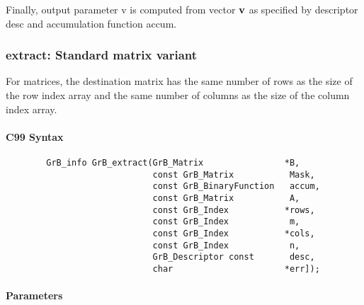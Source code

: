 Finally, output parameter {\sf v} is computed from vector ${\bf v}$ as
specified by descriptor {\sf desc} and accumulation function {\sf accum}.



\subsubsection{{\sf extract}: Standard matrix variant}

For matrices, the destination matrix has
the same number of rows as the size of the row index array and the same
number of columns as the size of the column index array.

\paragraph{C99 Syntax}

\begin{verbatim}                 
        GrB_info GrB_extract(GrB_Matrix                *B,
                             const GrB_Matrix           Mask,
                             const GrB_BinaryFunction   accum,
                             const GrB_Matrix           A,
                             const GrB_Index           *rows,
                             const GrB_Index            m,
                             const GrB_Index           *cols,
                             const GrB_Index            n,
                             GrB_Descriptor const       desc,
                             char                      *err]);
\end{verbatim}

\paragraph{Parameters}

